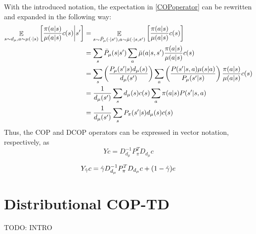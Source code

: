 \documentclass[12pt,a4paper,openright,twoside]{article}
\DeclareMathOperator*{\E}{\mathbb{E}}
\numberwithin{equation}{section}
\theoremstyle{definition}
\theoremstyle{remark}
\theoremstyle{plain}
\begin{document}
With the introduced notation, the expectation in \ref{COPoperator} can be rewritten and expanded in the following way:
\begin{equation} \label{expansionCSR}
\begin{split}
    \E_{s \sim d_\mu, a \sim \mu(\cdot|s)} \left[ \frac{\pi(a|s)}{\mu(a|s)}c(s)  \bigg| s' \right] &= \E_{s \sim \Bar{P}_\mu (\cdot | s'), a \sim \Bar{\mu}(\cdot|s,s')} \left[ \frac{\pi(a|s)}{\mu(a|s)}c(s) \right] \\
    &= \sum_s \Bar{P}_\mu (s | s') \sum_a \Bar{\mu}(a|s,s') \frac{\pi(a|s)}{\mu(a|s)} c(s) \\
    &= \sum_s \left( \frac{P_\mu (s' | s) d_\mu(s)}{d_\mu(s')}  \right) \sum_a  \left( \frac{P(s'|s,a)\mu(s|a)}{P_\mu (s'|s)} \right) \frac{\pi(a|s)}{\mu(a|s)} c(s) \\
    &= \frac{1}{d_\mu(s')} \sum_{s} d_\mu(s) c(s) \sum_a \pi(a|s) P(s'|s,a) \\
    &= \frac{1}{d_\mu(s')} \sum_{s} P_\pi(s'|s) d_\mu(s) c(s) \\
\end{split}
\end{equation}
Thus, the COP and DCOP operators can be expressed in vector notation, respectively, as
\begin{equation}
    Yc = D_{d_\mu}^{-1}P_\pi^T D_{d_\mu} c
\end{equation}

\begin{equation}
    Y_{\Hat{\gamma}}c = \Hat{\gamma} D_{d_\mu}^{-1}P_\pi^T D_{d_\mu} c + (1-\Hat{\gamma})e
\end{equation}

\newpage

\thispagestyle{plain}
\section{Distributional COP-TD}

TODO: INTRO
\end{document}
